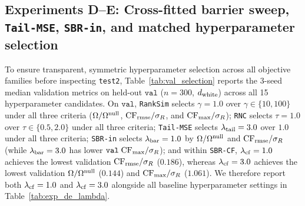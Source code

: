 \documentclass[preprint,11pt,a4paper]{elsarticle}
\begin{document}
\subsection{Experiments D--E: Cross-fitted barrier sweep, \texttt{Tail-MSE}, \texttt{SBR-in}, and matched hyperparameter selection}
\label{sec:exp_de}

To ensure transparent, symmetric hyperparameter selection across all objective families before inspecting \texttt{test2}, Table~\ref{tab:val_selection} reports the 3-seed median validation metrics on held-out $\texttt{val}$ ($n=300$, $d_{\rm white}$) across all 15 hyperparameter candidates. On $\texttt{val}$, \texttt{RankSim} selects $\gamma=1.0$ over $\gamma\in\{10,100\}$ under all three criteria ($\Omega/\Omega^{\rm null}$, ${\rm CF}_{\rm rmse}/\sigma_R$, and ${\rm CF}_{\max}/\sigma_R$); \texttt{RNC} selects $\tau=1.0$ over $\tau\in\{0.5,2.0\}$ under all three criteria; \texttt{Tail-MSE} selects $\lambda_{\rm tail}=3.0$ over $1.0$ under all three criteria; \texttt{SBR-in} selects $\lambda_{\rm bar}=1.0$ by $\Omega/\Omega^{\rm null}$ and ${\rm CF}_{\rm rmse}/\sigma_R$ (while $\lambda_{\rm bar}=3.0$ has lower $\texttt{val}\;{\rm CF}_{\max}/\sigma_R$); and within \texttt{SBR-CF}, $\lambda_{\rm cf}=1.0$ achieves the lowest validation ${\rm CF}_{\rm rmse}/\sigma_R$ ($0.186$), whereas $\lambda_{\rm cf}=3.0$ achieves the lowest validation $\Omega/\Omega^{\rm null}$ ($0.144$) and ${\rm CF}_{\max}/\sigma_R$ ($1.061$). We therefore report both $\lambda_{\rm cf}=1.0$ and $\lambda_{\rm cf}=3.0$ alongside all baseline hyperparameter settings in Table~\ref{tab:exp_de_lambda}.
\end{document}
